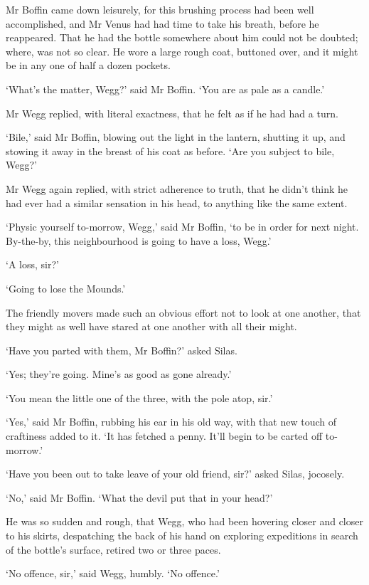 Mr Boffin came down leisurely, for this brushing process had been well
accomplished, and Mr Venus had had time to take his breath, before he
reappeared. That he had the bottle somewhere about him could not be
doubted; where, was not so clear. He wore a large rough coat, buttoned
over, and it might be in any one of half a dozen pockets.

‘What’s the matter, Wegg?’ said Mr Boffin. ‘You are as pale as a
candle.’

Mr Wegg replied, with literal exactness, that he felt as if he had had a
turn.

‘Bile,’ said Mr Boffin, blowing out the light in the lantern, shutting
it up, and stowing it away in the breast of his coat as before. ‘Are you
subject to bile, Wegg?’

Mr Wegg again replied, with strict adherence to truth, that he didn’t
think he had ever had a similar sensation in his head, to anything like
the same extent.

‘Physic yourself to-morrow, Wegg,’ said Mr Boffin, ‘to be in order
for next night. By-the-by, this neighbourhood is going to have a loss,
Wegg.’

‘A loss, sir?’

‘Going to lose the Mounds.’

The friendly movers made such an obvious effort not to look at one
another, that they might as well have stared at one another with all
their might.

‘Have you parted with them, Mr Boffin?’ asked Silas.

‘Yes; they’re going. Mine’s as good as gone already.’

‘You mean the little one of the three, with the pole atop, sir.’

‘Yes,’ said Mr Boffin, rubbing his ear in his old way, with that new
touch of craftiness added to it. ‘It has fetched a penny. It’ll begin to
be carted off to-morrow.’

‘Have you been out to take leave of your old friend, sir?’ asked Silas,
jocosely.

‘No,’ said Mr Boffin. ‘What the devil put that in your head?’

He was so sudden and rough, that Wegg, who had been hovering closer
and closer to his skirts, despatching the back of his hand on exploring
expeditions in search of the bottle’s surface, retired two or three
paces.

‘No offence, sir,’ said Wegg, humbly. ‘No offence.’

